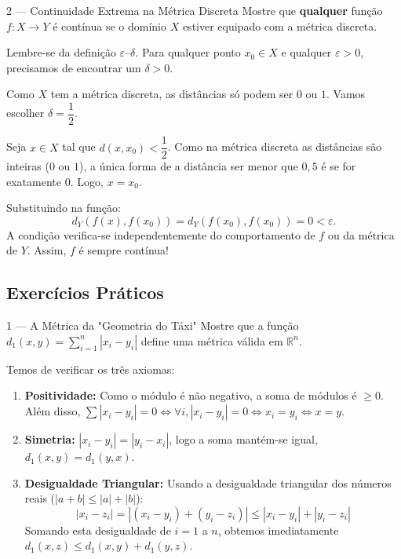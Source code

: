 \begin{exbox}{2 --- Continuidade Extrema na Métrica Discreta}
  Mostre que \textbf{qualquer} função $f:X\to Y$ é contínua se o domínio $X$ estiver equipado com a métrica discreta.
\end{exbox}
\begin{solbox}
  Lembre-se da definição $\varepsilon$--$\delta$. Para qualquer ponto $x_0\in X$ e qualquer $\varepsilon > 0$, precisamos de encontrar um $\delta > 0$.
  
  Como $X$ tem a métrica discreta, as distâncias só podem ser $0$ ou $1$. Vamos escolher $\delta = \dfrac{1}{2}$. 
  
  Seja $x \in X$ tal que $d(x, x_0) < \dfrac{1}{2}$. Como na métrica discreta as distâncias são inteiras ($0$ ou $1$), a única forma de a distância ser menor que $0{,}5$ é se for exatamente $0$. Logo, $x = x_0$.
  
  Substituindo na função:
  \[
    d_Y(f(x), f(x_0)) = d_Y(f(x_0), f(x_0)) = 0 < \varepsilon.
  \]
  A condição verifica-se independentemente do comportamento de $f$ ou da métrica de $Y$. Assim, $f$ é sempre contínua! \checkmark
\end{solbox}

\subsection{Exercícios Práticos}

\begin{exercisebox}{1 --- A Métrica da "Geometria do Táxi"}
  Mostre que a função $d_1(x,y)=\sum_{i=1}^n |x_i - y_i|$ define uma métrica válida em $\mathbb{R}^n$.
\end{exercisebox}
\begin{solbox}
  Temos de verificar os três axiomas:
  \begin{enumerate}
      \item \textbf{Positividade:} Como o módulo é não negativo, a soma de módulos é $\ge 0$. Além disso, $\sum |x_i - y_i| = 0 \iff \forall i, |x_i - y_i| = 0 \iff x_i = y_i \iff x = y$.
      \item \textbf{Simetria:} $|x_i - y_i| = |y_i - x_i|$, logo a soma mantém-se igual, $d_1(x,y) = d_1(y,x)$.
      \item \textbf{Desigualdade Triangular:} Usando a desigualdade triangular dos números reais ($|a+b| \le |a| + |b|$):
      \[
        |x_i - z_i| = |(x_i - y_i) + (y_i - z_i)| \le |x_i - y_i| + |y_i - z_i|
      \]
      Somando esta desigualdade de $i=1$ a $n$, obtemos imediatamente $d_1(x,z) \le d_1(x,y) + d_1(y,z)$. \checkmark
  \end{enumerate}
\end{solbox}

